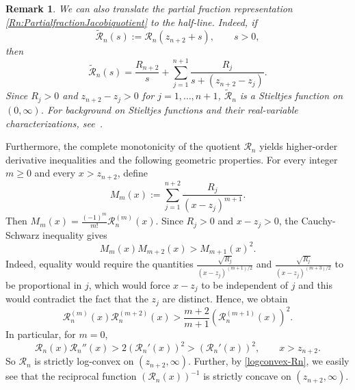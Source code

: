 \documentclass[final,3p,times,12pt]{elsarticle}
\newtheorem{remark}{Remark}[section]
\numberwithin{equation}{section}  %
\begin{document}
\begin{remark}
	We can also translate the  partial fraction representation
	\eqref{Rn:PartialfractionJacobiquotient}  to the
	half-line. Indeed, if
	\begin{equation*}
		\widetilde{\mathcal{R}}_n(s)
		:=
		\mathcal{R}_n(z_{n+2}+s),
		\qquad s>0,
	\end{equation*}
	then
	\begin{equation*}
		\widetilde{\mathcal{R}}_n(s)
		=
		\frac{R_{n+2}}{s}
		+
		\sum_{j=1}^{n+1}
		\frac{R_j}{s+(z_{n+2}-z_j)}.
	\end{equation*}
	Since $R_j>0$ and $z_{n+2}-z_j>0$ for $j=1,\ldots,n+1$,
	$\widetilde{\mathcal{R}}_n$ is a Stieltjes function on $(0,\infty)$.
	For background on Stieltjes functions and their real-variable
	characterizations, see~\cite{SokalExpomath2010}.
\end{remark}
Furthermore, the complete monotonicity of the quotient $\mathcal{R}_n$ yields higher-order derivative inequalities and the following geometric properties. For every integer $m\geq0$ and every $x>z_{n+2}$,	define
\begin{equation*}
	M_m(x)
	:=
	\sum_{j=1}^{n+2}
	\frac{R_j}{(x-z_j)^{m+1}}. \end{equation*}
    Then $ \displaystyle{M_m(x)
	=
	\frac{(-1)^m}{m!}\mathcal R_n^{(m)}(x)} $. Since $R_j>0$ and $x-z_j>0$, the Cauchy-Schwarz inequality gives
\begin{equation*}
	M_m(x)M_{m+2}(x)
	>
	M_{m+1}(x)^2.
\end{equation*} Indeed, equality would require the quantities $\displaystyle\frac{\sqrt{R_j}}{(x-z_j)^{(m+1)/2}}$ and $\displaystyle\frac{\sqrt{R_j}}{(x-z_j)^{(m+3)/2}}$ to be proportional in $j$, which would force $x-z_j$ to be independent of $j$ and this would contradict the fact that the $z_j$ are distinct. Hence,	we obtain 	\begin{equation}
	\label{eq:JacobiHigherDerivativeInequality}
	\mathcal R_n^{(m)}(x)\mathcal R_n^{(m+2)}(x)
	>
	\frac{m+2}{m+1}
	\left(\mathcal R_n^{(m+1)}(x)\right)^2.
\end{equation}
In particular, for
$m=0$,
\begin{equation}\label{logconvex-Rn}
	\mathcal R_n(x)\mathcal R_n''(x)
	>
	2\left(\mathcal R_n'(x)\right)^2>
	\left(\mathcal R_n'(x)\right)^2,
	\qquad
	x>z_{n+2}.
\end{equation}
So $\mathcal R_n$ is strictly log-convex on $(z_{n+2},\infty)$. Further, by \eqref{logconvex-Rn}, we easily see that the reciprocal function $(\mathcal{R}_n(x))^{-1}$ is strictly concave on $(z_{n+2},\infty)$.
\end{document}
